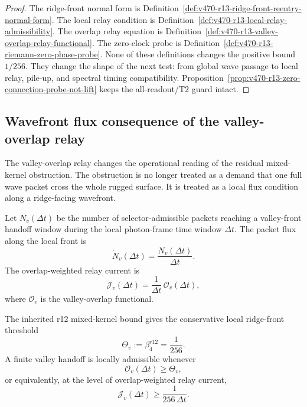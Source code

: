 \begin{proof}
The ridge-front normal form is Definition~\ref{def:v470-r13-ridge-front-reentry-normal-form}.
The local relay condition is Definition~\ref{def:v470-r13-local-relay-admissibility}.
The overlap relay equation is Definition~\ref{def:v470-r13-valley-overlap-relay-functional}.
The zero-clock probe is Definition~\ref{def:v470-r13-riemann-zero-phase-probe}.
None of these definitions changes the positive bound \(1/256\).  They change the
shape of the next test: from global wave passage to local relay, pile-up, and
spectral timing compatibility.  Proposition~\ref{prop:v470-r13-zero-connection-probe-not-lift}
keeps the all-readout/T2 guard intact.
\end{proof}



\subsection{Wavefront flux consequence of the valley-overlap relay}
\label{subsec:v470-r13-wavefront-flux-consequence}

The valley-overlap relay changes the operational reading of the residual
mixed-kernel obstruction.  The obstruction is no longer treated as a demand that
one full wave packet cross the whole rugged surface.  It is treated as a local
flux condition along a ridge-facing wavefront.

\begin{definition}
\label{def:v470-r13-wavefront-packet-flux}
Let \(N_v(\Delta t)\) be the number of selector-admissible packets reaching a
valley-front handoff window during the local photon-frame time window \(\Delta t\).
The packet flux along the local front is
\[
\dot N_v(\Delta t)=\frac{N_v(\Delta t)}{\Delta t}.
\]
The overlap-weighted relay current is
\[
\mathcal J_v(\Delta t)
=
\frac{1}{\Delta t}\,\mathcal O_v(\Delta t),
\]
where \(\mathcal O_v\) is the valley-overlap functional.
\end{definition}

\begin{definition}
\label{def:v470-r13-local-relay-threshold}
The inherited r12 mixed-kernel bound gives the conservative local ridge-front
threshold
\[
\Theta_v:=\beta_4^{r12}=\frac{1}{256}.
\]
A finite valley handoff is locally admissible whenever
\[
\mathcal O_v(\Delta t)\geq \Theta_v,
\]
or equivalently, at the level of overlap-weighted relay current,
\[
\mathcal J_v(\Delta t)
\geq
\frac{1}{256\,\Delta t}.
\]
\end{definition}

